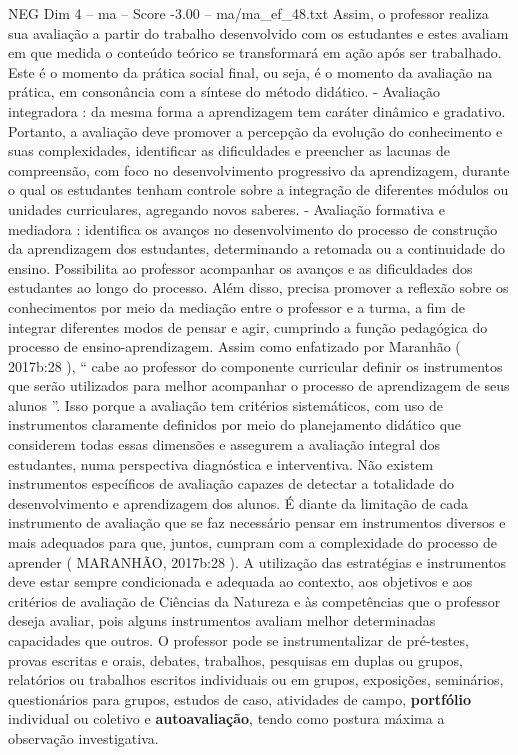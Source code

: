 \begin{textsample}{NEG Dim 4 – ma – Score -3.00 – ma/ma\_ef\_48.txt}
Assim, o professor realiza sua avaliação a partir do trabalho desenvolvido com os estudantes e estes avaliam em que medida o conteúdo teórico se transformará em ação após ser trabalhado.
Este é o momento da prática social final, ou seja, é o momento da avaliação na prática, em consonância com a síntese do método didático. - Avaliação integradora : da mesma forma a aprendizagem tem caráter dinâmico e gradativo.
Portanto, a avaliação deve promover a percepção da evolução do conhecimento e suas complexidades, identificar as dificuldades e preencher as lacunas de compreensão, com foco no desenvolvimento progressivo da aprendizagem, durante o qual os estudantes tenham controle sobre a integração de diferentes módulos ou unidades curriculares, agregando novos saberes. - Avaliação formativa e mediadora : identifica os avanços no desenvolvimento do processo de construção da aprendizagem dos estudantes, determinando a retomada ou a continuidade do ensino.
Possibilita ao professor acompanhar os avanços e as dificuldades dos estudantes ao longo do processo.
Além disso, precisa promover a reflexão sobre os conhecimentos por meio da mediação entre o professor e a turma, a fim de integrar diferentes modos de pensar e agir, cumprindo a função pedagógica do processo de ensino-aprendizagem.
Assim como enfatizado por Maranhão ( 2017b:28 ), “ cabe ao professor do componente curricular definir os instrumentos que serão utilizados para melhor acompanhar o processo de aprendizagem de seus alunos ”.
Isso porque a avaliação tem critérios sistemáticos, com uso de instrumentos claramente definidos por meio do planejamento didático que considerem todas essas dimensões e assegurem a avaliação integral dos estudantes, numa perspectiva diagnóstica e interventiva.
Não existem instrumentos específicos de avaliação capazes de detectar a totalidade do desenvolvimento e aprendizagem dos alunos.
É diante da limitação de cada instrumento de avaliação que se faz necessário pensar em instrumentos diversos e mais adequados para que, juntos, cumpram com a complexidade do processo de aprender ( MARANHÃO, 2017b:28 ).
A utilização das estratégias e instrumentos deve estar sempre condicionada e adequada ao contexto, aos objetivos e aos critérios de avaliação de Ciências da Natureza e às competências que o professor deseja avaliar, pois alguns instrumentos avaliam melhor determinadas capacidades que outros.
O professor pode se instrumentalizar de pré-testes, provas escritas e orais, debates, trabalhos, pesquisas em duplas ou grupos, relatórios ou trabalhos escritos individuais ou em grupos, exposições, seminários, questionários para grupos, estudos de caso, atividades de campo, \textbf{portfólio} individual ou coletivo e \textbf{autoavaliação}, tendo como postura máxima a observação investigativa.

\end{textsample}
